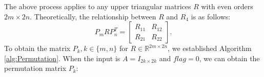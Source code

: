 \documentclass[1p]{elsarticle}
\numberwithin{equation}{section}
\begin{document}

  The above process  applies to any upper triangular matrices $R$ with even orders $2m \times 2n$. Theoretically, the relationship between $R$ and $R_4$ is as follows:
\begin{equation}\label{eq:Rn}
    P_{m} R P_{n}^T = \begin{bmatrix} R_{11} & R_{12}\\R_{21}& R_{22}\end{bmatrix}.
\end{equation}
To obtain the matrix $P_k, k\in \{m,n\}$ for $R \in \mathbb{R}^{2m \times 2n}$, we established Algorithm \ref{alg:Permutation}. When the input is $A=I_{2k \times 2k}$ and $flag=0$, we can obtain the permutation matrix $P_k$:
\end{document}

